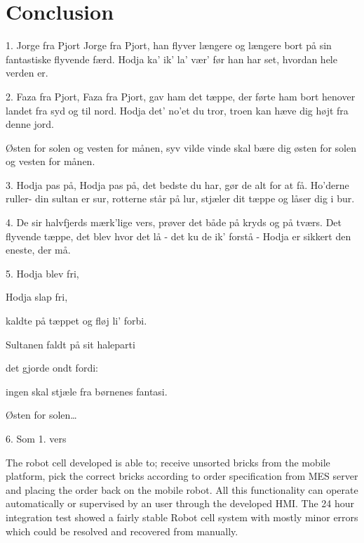\chapter{Conclusion}\label{chap:conclusion}
1. Jorge fra Pjort 
Jorge fra Pjort, 
han flyver længere og længere bort 
på sin fantastiske flyvende færd. 
Hodja ka’ ik’ la’ vær’ 
før han har set, hvordan hele verden er. 



2. Faza fra Pjort, 
Faza fra Pjort, 
gav ham det tæppe, der førte ham bort 
henover landet fra syd og til nord. 
Hodja det’ no’et du tror, 
troen kan hæve dig højt fra denne jord. 



Østen for solen og vesten for månen, 
syv vilde vinde skal bære dig 
østen for solen og vesten for månen. 

3. Hodja pas på, 
Hodja pas på, 
det bedste du har, gør de alt for at få. 
Ho’derne ruller- din sultan er sur, 
rotterne står på lur, 
stjæler dit tæppe og låser dig i bur. 


4. De sir halvfjerds 
mærk’lige vers, 
prøver det både på kryds og på tværs. 
Det flyvende tæppe, det blev hvor det lå 
- det ku de ik’ forstå - 
Hodja er sikkert den eneste, der må. 


5. Hodja blev fri, 

Hodja slap fri, 

kaldte på tæppet og fløj li’ forbi. 

Sultanen faldt på sit haleparti 

det gjorde ondt fordi: 

ingen skal stjæle fra børnenes fantasi. 



Østen for solen…



6. Som 1. vers 


The robot cell developed is able to; receive unsorted bricks from the mobile platform, pick the correct bricks according to order specification from MES server and placing the order back on the mobile robot. All this functionality can operate automatically or supervised by an user through the developed HMI. The 24 hour integration test showed a fairly stable Robot cell system with mostly minor errors which could be resolved and recovered from manually.




